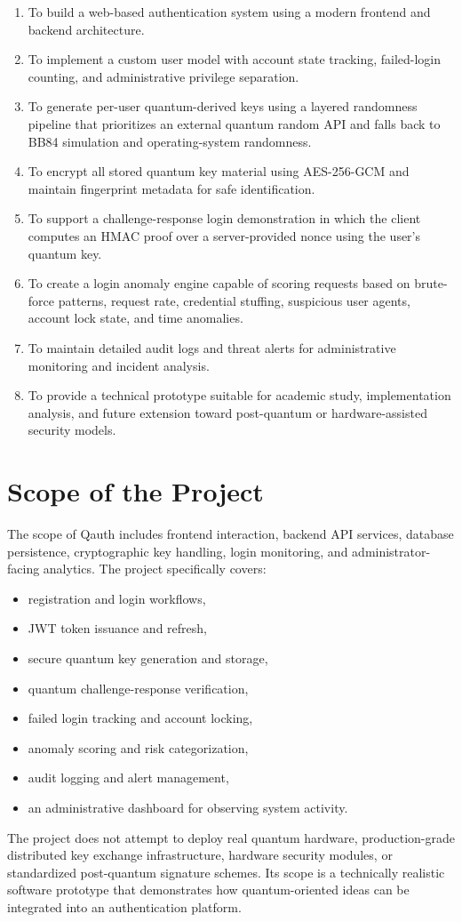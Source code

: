 \documentclass[12pt,a4paper]{report}
\begin{document}
\begin{enumerate}
    \item To build a web-based authentication system using a modern frontend and backend architecture.
    \item To implement a custom user model with account state tracking, failed-login counting, and administrative privilege separation.
    \item To generate per-user quantum-derived keys using a layered randomness pipeline that prioritizes an external quantum random API and falls back to BB84 simulation and operating-system randomness.
    \item To encrypt all stored quantum key material using AES-256-GCM and maintain fingerprint metadata for safe identification.
    \item To support a challenge-response login demonstration in which the client computes an HMAC proof over a server-provided nonce using the user's quantum key.
    \item To create a login anomaly engine capable of scoring requests based on brute-force patterns, request rate, credential stuffing, suspicious user agents, account lock state, and time anomalies.
    \item To maintain detailed audit logs and threat alerts for administrative monitoring and incident analysis.
    \item To provide a technical prototype suitable for academic study, implementation analysis, and future extension toward post-quantum or hardware-assisted security models.
\end{enumerate}

\section{Scope of the Project}
The scope of Qauth includes frontend interaction, backend API services, database persistence, cryptographic key handling, login monitoring, and administrator-facing analytics. The project specifically covers:

\begin{itemize}
    \item registration and login workflows,
    \item JWT token issuance and refresh,
    \item secure quantum key generation and storage,
    \item quantum challenge-response verification,
    \item failed login tracking and account locking,
    \item anomaly scoring and risk categorization,
    \item audit logging and alert management,
    \item an administrative dashboard for observing system activity.
\end{itemize}
The project does not attempt to deploy real quantum hardware, production-grade distributed key exchange infrastructure, hardware security modules, or standardized post-quantum signature schemes. Its scope is a technically realistic software prototype that demonstrates how quantum-oriented ideas can be integrated into an authentication platform.
\end{document}
